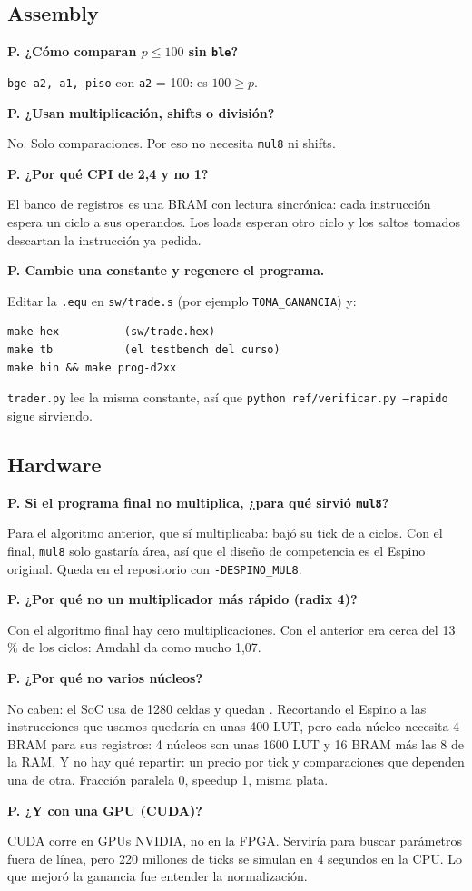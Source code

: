 \documentclass[11pt,letterpaper]{article}
\newcounter{preg}
\newcommand{\preg}[1]{\stepcounter{preg}\par\medskip\noindent\textbf{P\thepreg. #1}\par\noindent}
\begin{document}
\subsection*{Assembly}
\preg{¿Cómo comparan $p \le 100$ sin \texttt{ble}?}
\texttt{bge a2, a1, piso} con \texttt{a2} = 100: es $100 \ge p$.

\preg{¿Usan multiplicación, shifts o división?}
No. Solo comparaciones. Por eso no necesita \texttt{mul8} ni shifts.

\preg{¿Por qué CPI de 2,4 y no 1?}
El banco de registros es una BRAM con lectura sincrónica: cada instrucción espera un ciclo a sus
operandos. Los loads esperan otro ciclo y los saltos tomados descartan la instrucción ya pedida.

\preg{Cambie una constante y regenere el programa.}
Editar la \texttt{.equ} en \texttt{sw/trade.s} (por ejemplo \texttt{TOMA\_GANANCIA}) y:
\begin{lstlisting}
make hex          (sw/trade.hex)
make tb           (el testbench del curso)
make bin && make prog-d2xx
\end{lstlisting}
\texttt{trader.py} lee la misma constante, así que \texttt{python ref/verificar.py --rapido} sigue sirviendo.

\subsection*{Hardware}
\preg{Si el programa final no multiplica, ¿para qué sirvió \texttt{mul8}?}
Para el algoritmo anterior, que sí multiplicaba: bajó su tick de \CiclosPromSw{} a \CiclosPromMul{}
ciclos. Con el final, \texttt{mul8} solo gastaría área, así que el diseño de competencia es el Espino
original. Queda en el repositorio con \texttt{-DESPINO\_MUL8}.

\preg{¿Por qué no un multiplicador más rápido (radix 4)?}
Con el algoritmo final hay cero multiplicaciones. Con el anterior era cerca del 13\,\% de los ciclos:
Amdahl da como mucho 1,07.

\preg{¿Por qué no varios núcleos?}
No caben: el SoC usa \LCSw{} de 1280 celdas y quedan \LCLibres. Recortando el Espino a las
instrucciones que usamos quedaría en unas 400 LUT, pero cada núcleo necesita 4 BRAM para sus registros:
4 núcleos son unas 1600 LUT y 16 BRAM más las 8 de la RAM. Y no hay qué repartir: un precio por tick y
comparaciones que dependen una de otra. Fracción paralela 0, speedup 1, misma plata.

\preg{¿Y con una GPU (CUDA)?}
CUDA corre en GPUs NVIDIA, no en la FPGA. Serviría para buscar parámetros fuera de línea, pero 220
millones de ticks se simulan en 4 segundos en la CPU. Lo que mejoró la ganancia fue entender la
normalización.
\end{document}
